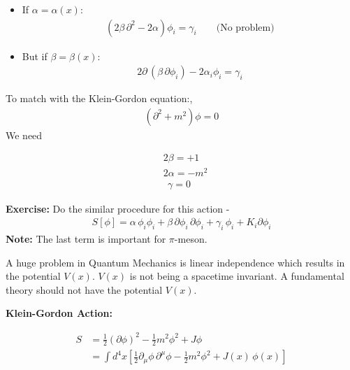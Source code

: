 \documentclass[14pt]{article} %
\begin{document}
\begin{itemize}
\item If $\alpha = \alpha(x)$:
\begin{align*}
(2\beta \, \partial^2 - 2\alpha) \phi_i = \gamma_i
\quad \quad \text{(No problem)}\end{align*}
\item But if $\beta = \beta(x)$:
\begin{align*}
2 \partial\,(\beta \, \partial \phi_i) - 2\alpha_i \phi_i = \gamma_i
\end{align*}
\end{itemize} 
To match with the Klein-Gordon equation:,
\begin{align*}
(\partial^2 + m^2)\phi = 0
\end{align*}
We need

\begin{align*}
    & 2\beta = +1 \\
    & 2\alpha = -m^2 \\
    & ~~\gamma = 0
\end{align*}
\begin{framed}
\textbf{Exercise:} Do the similar procedure for this action -
\begin{align*}
S[\phi] = \alpha\, \phi_i \phi_i + \beta\, \partial \phi_i \, \partial \phi_i + \gamma_i\, \phi_i + K_i \partial \phi_i
\end{align*}
\textbf{Note:} The last term is important for $\pi$-meson.
\end{framed}
\begin{tcolorbox}[ title=Note]
A huge problem in Quantum Mechanics is linear independence which results in the potential \( V(x)\). $V(x)$ is not being a spacetime invariant. A fundamental theory should not have the potential \( V(x) \).
\end{tcolorbox}

\textbf{Klein-Gordon Action:}

\begin{align*}
S &= \frac{1}{2} (\partial \phi)^2 - \frac{1}{2} m^2 \phi^2 + J\phi \\
  &= \int d^4x \left[ \frac{1}{2} \partial_\mu \phi \,\partial^\mu \phi - \frac{1}{2} m^2 \phi^2 + J(x)\, \phi(x) \right]
\end{align*}
\end{document}
